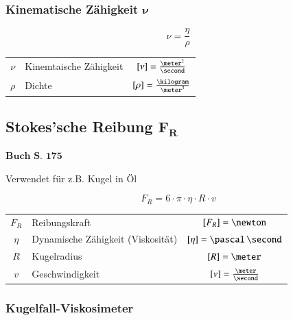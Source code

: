 \medskip


\subsubsection{Kinematische Zähigkeit $\bm{\nu}$}

\begin{minipage}[c]{0.3\columnwidth}
    $$ \boxed{ \nu = \frac{\eta}{\rho} } $$
\end{minipage}
\hfill
\begin{minipage}[c]{0.68\columnwidth}
    \renewcommand{\arraystretch}{1.5}
    \begin{tabular}{c l c}
        $\nu$   & Kinemtaische Zähigkeit    & $[\nu] = \frac{\meter^2}{\second}$    \\
        $\rho$  & Dichte                    & $[\rho] = \frac{\kilogram}{\meter^3}$ \\	
    \end{tabular}
    \renewcommand{\arraystretch}{1.5}
\end{minipage}


\subsection[Stokes'sche Reibung]{Stokes'sche Reibung $\bm{F_R}$}

\begin{flushright}
	$\boxed{\textbf{Buch S. 175}}$
\end{flushright}


Verwendet für z.B. Kugel in Öl

$$ \boxed{ F_R = 6 \cdot \pi \cdot \eta \cdot R \cdot v } $$

\begin{tabular}{c l c}
    $F_R$   & Reibungskraft                     & $[F_R] = \newton$                         \\
    $\eta$  & Dynamische Zähigkeit (Viskosität) & $[\eta] = \mathrm{\pascal \, \second}$    \\
    $R$     & Kugelradius                       & $[R] = \meter$                            \\
    $v$     & Geschwindigkeit                   & $[v] = \frac{\meter}{\second}$		
\end{tabular}


\subsubsection{Kugelfall-Viskosimeter}

